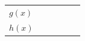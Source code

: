 {{\begin{center}
\begin{tabular}[t]{|l|l|l|l|l|l|}
                  $g\left(x\right)$
                 &
         &
         &
         &
         &
     \tabularnewline\cline{1-1}\cline{2-2}\cline{3-3}\cline{4-4}\cline{5-5}\cline{6-6}
                  $h\left(x\right)$
                 &
         &
         &
         &
         &
     \tabularnewline\cline{1-1}\cline{2-2}\cline{3-3}\cline{4-4}\cline{5-5}\cline{6-6}

\end{tabular}
\end{center}}}
